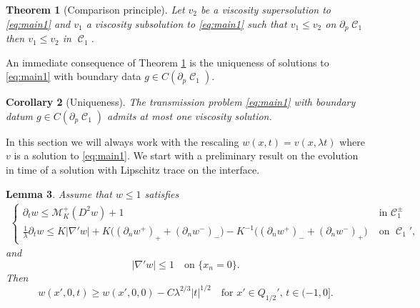 \documentclass[12pt]{article}
\newtheorem{Theorem}{Theorem}
\numberwithin{Theorem}{section}
\newtheorem{Lemma}[Theorem]{Lemma}
\newtheorem{Corollary}[Theorem]{Corollary}
\theoremstyle{definition}
\theoremstyle{remark}
\numberwithin{equation}{section}
\DeclareMathOperator{\C}{\mathcal{C}}
\newcommand*{\Mp}{\mathcal{M}_{K}^{+}}
\newcommand{\p}{\partial}
\begin{document}
\begin{Theorem}[Comparison principle] \label{Thm:CP}
Let $v_2$ be a viscosity supersolution to \eqref{eq:main1} and $v_1$ a viscosity subsolution to \eqref{eq:main1} such that $v_1 \leq v_2$ on $\p _p\C_1$
    then $ v_1 \leq v_2 $ in $\C_1$. 
\end{Theorem}

An immediate consequence of Theorem \ref{Thm:CP} is the uniqueness of solutions to \eqref{eq:main1} with  boundary data $g \in C(\p_p \C_1)$. 
\begin{Corollary}[Uniqueness]\label{cor:uniqueness}
    The transmission problem \eqref{eq:main1} with boundary datum $g \in  C(\p_p \C_1)$ admits at most one viscosity solution.
\end{Corollary}


In this section we will always work with the rescaling $w(x,t)=v(x,\lambda t)$ where $v$ is a solution to \eqref{eq:main1}.
We start with a preliminary result on the evolution in time of a solution with Lipschitz trace on the interface. 

\begin{Lemma} \label{lm:lipschitz_trace}
    Assume that $w\leq 1$ satisfies 
    \begin{align}\label{eq:pucci_trans}
        \begin{cases}
            \p_t w \leq \Mp(D^2w)+1 &\mbox{ in } \C_1^\pm\\
              \frac{1}{\lambda} \p_t w \leq K |\nabla' w| + K\big( (\p_n w^+)_+ + (\p_n w^-)_- \big) - K^{-1}\big( (\p_n w^+)_- + (\p_n w^-)_+ \big)& \text{ on }\C_{1}',
        \end{cases}
    \end{align}
    and 
    \[
    |\nabla'w| \leq 1 \quad \text{on }\{x_n=0 \}.
    \]
    Then 
    \[
    w(x',0,t) \geq w(x',0,0) - C \lambda^{2/3} |t|^{1/2} \quad \text{for }x' \in Q_{1/2}', \, t \in (-1,0].
    \]
\end{Lemma}
\end{document}
